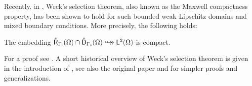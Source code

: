 \documentclass[a4paper]{amsart}
\newcommand{\cptemb}{\hookto\hspace*{-0.85em}\hookto}
\begin{document}
Recently, in \cite{bauerpaulyschomburgmcpweaklip}, 
Weck's selection theorem, also known as the Maxwell compactness property, has been shown
to hold for such bounded weak Lipschitz domains and mixed boundary conditions.
More precisely, the following holds:

\begin{lem}
\label{weckstlem}
The embedding
$\rcgatom\cap\dcganom\cptemb\ltom$
is compact.
\end{lem}

For a proof see \cite[Theorem 4.7]{bauerpaulyschomburgmcpweaklip}. 
A short historical overview of Weck's selection theorem
is given in the introduction of \cite{bauerpaulyschomburgmcpweaklip},
see also the original paper \cite{weckmax} and 
\cite{picardcomimb,webercompmax,costabelremmaxlip,witschremmax,jochmanncompembmaxmixbc,leisbook}
for simpler proofs and generalizations.
\end{document}
